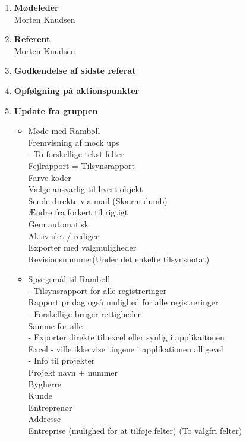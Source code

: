 	\begin{enumerate}
		\itemsep 0.3em 
		\item \textbf{Mødeleder}\\
			Morten Knudsen
		\item \textbf{Referent}\\
			Morten Knudsen
		\item \textbf{Godkendelse af sidste referat}
			
		\item\textbf{Opfølgning på aktionspunkter}

		\item \textbf{Update fra gruppen}
			\begin{itemize}[-]
			\item Møde med Rambøll\\
			Fremvisning af mock ups \\
			 - To forskellige tekst felter \\
			 Fejlrapport = Tilsynsrapport \\
			 Farve koder \\
			 Vælge ansvarlig til hvert objekt \\
			 Sende direkte via mail (Skærm dumb) \\
			 Ændre fra forkert til rigtigt \\
			 Gem automatisk \\
			 Aktiv slet / rediger \\
			 Exporter med valgmuligheder \\
			 Revisionsnummer(Under det enkelte tilsynsnotat) \\
			 
			\item Spørgsmål til Rambøll\\
			- Tilsynsrapport for alle registreringer \\
				Rapport pr dag også mulighed for alle registreringer \\
			- Forskellige bruger rettigheder \\
				Samme for alle \\
			- Exporter direkte til excel eller synlig i applikaitonen \\
				Excel - ville ikke vise tingene i applikationen alligevel \\
			- Info til projekter \\
				Projekt navn + nummer \\ 
				Bygherre \\
				Kunde \\
				Entreprenør \\
				Addresse \\
				Entreprise (mulighed for at tilføje felter) (To valgfri felter) \\
							

\end{itemize}
\end{enumerate}
